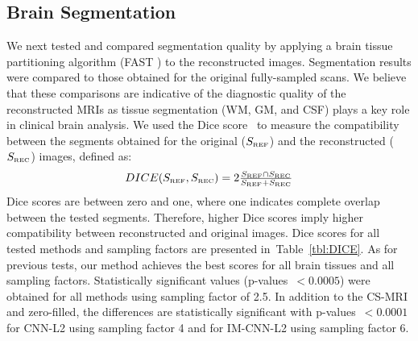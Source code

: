 \documentclass[10pt,journal,compsoc]{IEEEtran}
\begin{document}
%


\subsection{Brain Segmentation}
We next tested and compared segmentation quality by applying a brain tissue partitioning algorithm (FAST \cite{zhang2001segmentation}) to the reconstructed images. Segmentation results were compared to those obtained for the original fully-sampled scans. We believe that these comparisons are indicative of the diagnostic quality of the reconstructed MRIs as tissue segmentation (WM, GM, and CSF) plays a key role in clinical brain analysis.
We used the Dice score~\cite{dice1945measures} to measure the compatibility between the segments obtained for the original ($S_{\mbox{\tiny{REF}}}$) and the reconstructed ($S_{\mbox{\tiny{REC}}}$) images, defined as:
\begin{equation}
\begin{array}{c}
DICE(S_{\mbox{\tiny{REF}}}, S_{\mbox{\tiny{REC}}}) = 2\frac{S_{\mbox{\tiny{REF}}} \cap S_{\mbox{\tiny{REC}}}}{S_{\mbox{\tiny{REF}}} + S_{\mbox{\tiny{REC}}}}
\end{array}
\end{equation}
Dice scores are between zero and one, where one indicates complete overlap between the tested segments. Therefore, higher Dice scores imply higher compatibility between reconstructed and original images.
Dice scores for all tested methods and sampling factors are presented in~Table~\ref{tbl:DICE}. As for previous tests, our method achieves the best scores for all brain tissues and all sampling factors. Statistically significant values (p-values~$<0.0005$) were obtained for all methods using sampling factor of 2.5. In addition to the CS-MRI and zero-filled, the differences are statistically significant with p-values~$<0.0001$ for CNN-L2 using sampling factor 4 and for IM-CNN-L2 using sampling factor 6.
\end{document}
